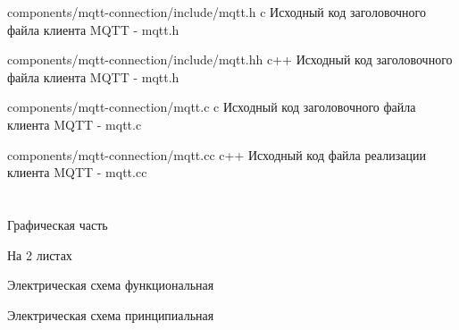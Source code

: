 \documentclass{bmstu}
\begin{document}
\begin{appendices}
        {components/mqtt-connection/include/mqtt.h} %
        {c}
        {Исходный код заголовочного файла клиента MQTT - mqtt.h} %

        {components/mqtt-connection/include/mqtt.hh} %
        {c++}
        {Исходный код заголовочного файла клиента MQTT - mqtt.h} %


        {components/mqtt-connection/mqtt.c} %
        {c}
        {Исходный код заголовочного файла клиента MQTT - mqtt.c} %

        {components/mqtt-connection/mqtt.cc} %
        {c++}
        {Исходный код файла реализации клиента MQTT - mqtt.cc} %

        \chapter{}
            {
                \centering
                Графическая часть

                На 2 листах

                Электрическая схема функциональная

                Электрическая схема принципиальная

            }\label{ch:}
    \end{appendices}
\end{document}
